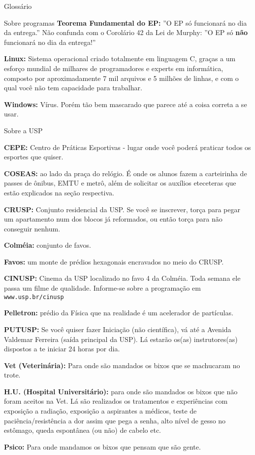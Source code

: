 \begin{secao}{Glossário}
\begin{subsecao}{Sobre programas}
{\bf Teorema Fundamental do EP:} ''O EP só funcionará no dia da entrega.'' Não
confunda com o Corolário 42 da Lei de Murphy: ''O EP só {\bf não} funcionará no
dia da entrega!''

{\bf Linux:} Sistema operacional criado totalmente em linguagem C, graças a um
esforço mundial de milhares de programadores e experts em informática, composto
por aproximadamente 7 mil arquivos e 5 milhões de linhas, e com o qual você não
tem capacidade para trabalhar.

{\bf Windows:} Vírus. Porém tão bem mascarado que parece até a coisa correta a
se usar.
\end{subsecao}

\begin{subsecao}{Sobre a USP}

{\bf CEPE:} Centro de Práticas Esportivas - lugar onde você poderá praticar
todos os esportes que quiser.

{\bf COSEAS:} ao lado da praça do relógio. É onde os alunos fazem a carteirinha
de passes de ônibus, EMTU e metrô, além de solicitar os auxílios eteceteras que
estão explicados na seção respectiva.

{\bf CRUSP:} Conjunto residencial da USP. Se você se inscrever, torça para
pegar um apartamento num dos blocos já reformados, ou então torça para não
conseguir nenhum.

{\bf Colméia:} conjunto de favos.

{\bf Favos:} um monte de prédios hexagonais encravados no meio do CRUSP.

{\bf CINUSP:} Cinema da USP localizado no favo 4 da Colméia. Toda semana ele
passa um filme de qualidade. Informe-se sobre a programação em {\tt www.usp.br/cinusp}

{\bf Pelletron:} prédio da Física que na realidade é um acelerador de
partículas.

{\bf PUTUSP:} Se você quiser fazer Iniciação (não científica), vá até a
Avenida Valdemar Ferreira (saída principal da USP). Lá estarão os(as)
instrutores(as) dispostos a te iniciar 24 horas por dia.

{\bf Vet (Veterinária):} Para onde são mandados os bixos que se machucaram no
trote.

{\bf H.U. (Hospital Universitário):} para onde são mandados os bixos que não
foram aceitos na Vet. Lá são realizados os tratamentos e experiências com
exposição a radiação, exposição a aspirantes a médicos, teste de
paciência/resistência a dor assim que pega a senha, alto nível de gesso no
estômago, queda espontânea (ou não) de cabelo etc.

{\bf Psico:} Para onde mandamos os bixos que pensam que são gente.

\end{subsecao}
\end{secao}
